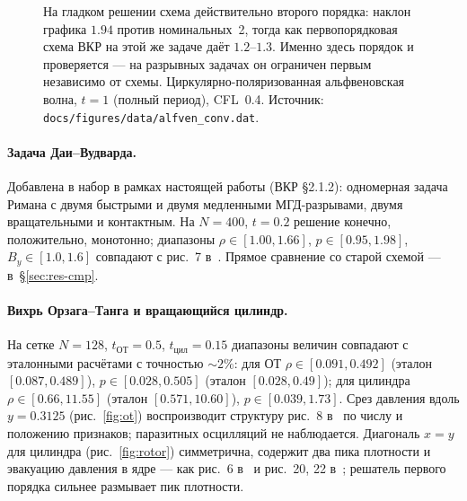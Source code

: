 \documentclass[12pt,a4paper]{article}
\newcommand{\code}[1]{\texttt{#1}}
\begin{document}
\begin{figure}[htbp]\centering
{}
\caption{На гладком решении схема действительно второго порядка: наклон
графика $1.94$ против номинальных~2, тогда как первопорядковая схема ВКР на этой
же задаче даёт $1.2$--$1.3$. Именно здесь порядок и проверяется --- на разрывных
задачах он ограничен первым независимо от схемы. Циркулярно-поляризованная
альфвеновская волна, $t=1$ (полный период), CFL~0.4. Источник:
\code{docs/figures/data/alfven\_conv.dat}.}
\label{fig:conv}
\end{figure}

\paragraph{Задача Даи--Вудварда.}
Добавлена в набор в рамках настоящей работы (ВКР \S2.1.2): одномерная задача
Римана с двумя быстрыми и двумя медленными МГД-разрывами, двумя вращательными
и контактным. На $N=400$, $t=0.2$ решение конечно, положительно, монотонно;
диапазоны $\rho\in[1.00,1.66]$, $p\in[0.95,1.98]$, $B_y\in[1.0,1.6]$ совпадают
с рис.~7 в~\cite{shamanov2025}. Прямое сравнение со старой схемой ---
в~\S\ref{sec:res-cmp}.

\paragraph{Вихрь Орзага--Танга и вращающийся цилиндр.}
На сетке $N=128$, $t_{\text{ОТ}}=0.5$, $t_{\text{цил}}=0.15$ диапазоны величин
совпадают с эталонными расчётами \cite{avdeeva2019,shamanov2025} с точностью
$\sim2\%$: для ОТ $\rho\in[0.091,0.492]$ (эталон $[0.087,0.489]$),
$p\in[0.028,0.505]$ (эталон $[0.028,0.49]$); для цилиндра
$\rho\in[0.66,11.55]$ (эталон $[0.571,10.60]$), $p\in[0.039,1.73]$. Срез
давления вдоль $y=0.3125$ (рис.~\ref{fig:ot}) воспроизводит структуру
рис.~8 в~\cite{avdeeva2019} по числу и положению признаков; паразитных
осцилляций не наблюдается. Диагональ $x=y$ для цилиндра
(рис.~\ref{fig:rotor}) симметрична, содержит два пика плотности и эвакуацию
давления в ядре --- как рис.~6 в~\cite{avdeeva2019} и рис.~20, 22
в~\cite{shamanov2025}; решатель первого порядка сильнее размывает пик
плотности.
\end{document}
